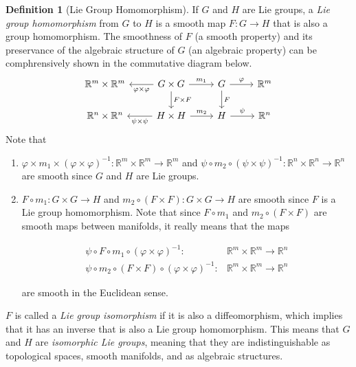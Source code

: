 \documentclass{article}
\theoremstyle{remark}
\theoremstyle{definition}
\newtheorem{definition}{Definition}[section]
\begin{document}
    \begin{definition}[Lie Group Homomorphism]
    If $G$ and $H$ are Lie groups, a \textit{Lie group homomorphism} from $G$ to $H$ is a smooth map $F: G \longrightarrow H$ that is also a group homomorphism. 
    The smoothness of $F$ (a smooth property) and its preservance of the algebraic structure of $G$ (an algebraic property) can be comphrensively shown in the commutative diagram below.
    \[
      \begin{tikzcd}
        \mathbb{R}^m \times \mathbb{R}^m & G \times G \arrow{l}{\varphi \times \varphi} \arrow{r}{m_1} \arrow{d}{F \times F} & G \arrow{r}{\varphi} \arrow{d}{F} & \mathbb{R}^m \\
        \mathbb{R}^n \times \mathbb{R}^n & H \times H \arrow{l}{\psi \times \psi} \arrow{r}{m_2} & H \arrow{r}{\psi} & \mathbb{R}^n
      \end{tikzcd}
    \]
    Note that
    \begin{enumerate}
      \item $\varphi \times m_1 \times (\varphi \times \varphi)^{-1} : \mathbb{R}^m \times \mathbb{R}^m \longrightarrow \mathbb{R}^m$ and $\psi \circ m_2 \circ (\psi \times \psi)^{-1}: \mathbb{R}^n \times \mathbb{R}^n \longrightarrow \mathbb{R}^n$ are smooth since $G$ and $H$ are Lie groups. 

      \item $F \circ m_1: G \times G \longrightarrow H$ and $m_2 \circ (F \times F): G \times G \longrightarrow H$ are smooth since $F$ is a Lie group homomorphism. Note that since $F \circ m_1$ and $m_2 \circ (F \times F)$ are smooth maps between manifolds, it really means that the maps 

      \begin{align*}
        \psi \circ F \circ m_1 \circ (\varphi \times \varphi)^{-1}: &\mathbb{R}^m \times \mathbb{R}^m \longrightarrow \mathbb{R}^n \\
        \psi \circ m_2 \circ (F \times F) \circ (\varphi \times \varphi)^{-1}: &\mathbb{R}^m \times \mathbb{R}^m \longrightarrow \mathbb{R}^n
      \end{align*}

      are smooth in the Euclidean sense. 
    \end{enumerate}

    $F$ is called a \textit{Lie group isomorphism} if it is also a diffeomorphism, which implies that it has an inverse that is also a Lie group homomorphism. This means that $G$ and $H$ are \textit{isomorphic Lie groups}, meaning that they are indistinguishable as topological spaces, smooth manifolds, and as algebraic structures. 
    \end{definition}
\end{document}
